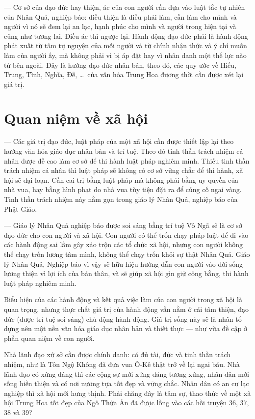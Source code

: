 — Cơ sở của đạo đức hay thiện, ác của con người cần dựa vào luật tắc tự nhiên của Nhân Quả, nghiệp báo: điều thiện là điều phải làm, cần làm cho mình và người vì nó sẽ đem lại an lạc, hạnh phúc cho mình và người trong hiện tại và cũng như tương lai. Điều ác thì ngược lại. Hành động đạo đức phải là hành động phát xuất từ tâm tự nguyện của mỗi người và từ chính nhận thức và ý chí muốn làm của người ấy, mà không phải vì bị áp đặt hay vì nhân danh một thế lực nào từ bên ngoài. Đây là hướng đạo đức nhân bản, theo đó, các quy ước về Hiếu, Trung, Tình, Nghĩa, Đễ, \ldots ~của văn hóa Trung Hoa đương thời cần được xét lại giá trị.

\section{Quan niệm về xã hội} %
\label{sec:36_37_xa_hoi}

— Các giá trị đạo đức, luật pháp của một xã hội cần được thiết lập lại theo hướng văn hóa giáo dục nhân bản và trí tuệ. Theo đó tinh thần trách nhiệm cá nhân được đề cao làm cơ sở để thi hành luật pháp nghiêm minh. Thiếu tinh thần trách nhiệm cá nhân thì luật pháp sẽ không có cơ sở vững chắc để thi hành, xã hội sẽ đại loạn. Cần cai trị bằng luật pháp mà không phải bằng uy quyền của nhà vua, hay bằng hình phạt do nhà vua tùy tiện đặt ra để củng cố ngai vàng. Tinh thần trách nhiệm này nằm gọn trong giáo lý Nhân Quả, nghiệp báo của Phật Giáo.

— Giáo lý Nhân Quả nghiệp báo được soi sáng bằng trí tuệ Vô Ngã sẽ là cơ sở đạo đức cho con người và xã hội. Con người có thể trốn chạy pháp luật để đi vào các hành động sai lầm gây xáo trộn các tổ chức xã hội, nhưng con người không thể chạy trốn lương tâm mình, không thể chạy trốn khỏi sự thật Nhân Quả. Giáo lý Nhân Quả, Nghiệp báo vì vậy sẽ hữu hiệu hướng dẫn con người vào đời sống lương thiện vì lợi ích của bản thân, và sẽ giúp xã hội gìn giữ công bằng, thi hành luật pháp nghiêm minh.

Biểu hiện của các hành động và kết quả việc làm của con người trong xã hội là quan trọng, nhưng thực chất giá trị của hành động vẫn nằm ở cái tâm thiện, đạo đức (được trí tuệ soi sáng) chủ động hành động. Giá trị sống này sẽ là nhân tố dựng nên một nền văn hóa giáo dục nhân bản và thiết thực — như vừa đề cập ở phần quan niệm về con người.

Nhà lãnh đạo xứ sở cần được chính danh: có đủ tài, đức và tinh thần trách nhiệm, như là Tôn Ngộ Không đã đưa vua Ô-Kê thật trở về lại ngai báu. Nhà lãnh đạo có xứng đáng thì các cộng sự mới xứng đáng tương xứng, nhân dân mới sống hiền thiện và có nơi nương tựa tốt đẹp và vững chắc. Nhân dân có an cư lạc nghiệp thì xã hội mới hưng thịnh. Phải chăng đây là tâm sự, thao thức về một xã hội Trung Hoa tốt đẹp của Ngô Thừa Ân đã được lồng vào các hồi truyện 36, 37, 38 và 39?
